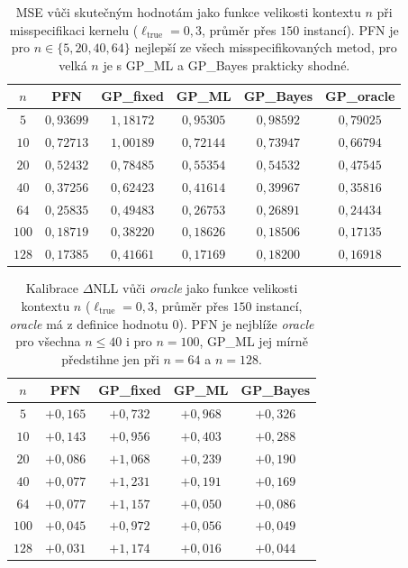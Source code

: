 \begin{table}[!htb]
    \centering
    \begin{tabular}{cccccc}
    \hline
    $n$ & PFN & GP\_fixed & GP\_ML & GP\_Bayes & GP\_oracle \\
    \hline
    $5$   & $0{,}93699$ & $1{,}18172$ & $0{,}95305$ & $0{,}98592$ & $0{,}79025$ \\
    $10$  & $0{,}72713$ & $1{,}00189$ & $0{,}72144$ & $0{,}73947$ & $0{,}66794$ \\
    $20$  & $0{,}52432$ & $0{,}78485$ & $0{,}55354$ & $0{,}54532$ & $0{,}47545$ \\
    $40$  & $0{,}37256$ & $0{,}62423$ & $0{,}41614$ & $0{,}39967$ & $0{,}35816$ \\
    $64$  & $0{,}25835$ & $0{,}49483$ & $0{,}26753$ & $0{,}26891$ & $0{,}24434$ \\
    $100$ & $0{,}18719$ & $0{,}38220$ & $0{,}18626$ & $0{,}18506$ & $0{,}17135$ \\
    $128$ & $0{,}17385$ & $0{,}41661$ & $0{,}17169$ & $0{,}18200$ & $0{,}16918$ \\
    \hline
    \end{tabular}
    \caption{MSE vůči skutečným hodnotám jako funkce velikosti kontextu $n$ při misspecifikaci kernelu ($\ell_{\text{true}} = 0{,}3$, průměr přes $150$ instancí). PFN je pro $n \in \{5, 20, 40, 64\}$ nejlepší ze všech misspecifikovaných metod, pro velká $n$ je s GP\_ML a GP\_Bayes prakticky shodné.}
    \label{tab:exp7_mse_n}
\end{table}

\begin{table}[!htb]
    \centering
    \begin{tabular}{ccccc}
    \hline
    $n$ & PFN & GP\_fixed & GP\_ML & GP\_Bayes \\
    \hline
    $5$   & $+0{,}165$ & $+0{,}732$ & $+0{,}968$ & $+0{,}326$ \\
    $10$  & $+0{,}143$ & $+0{,}956$ & $+0{,}403$ & $+0{,}288$ \\
    $20$  & $+0{,}086$ & $+1{,}068$ & $+0{,}239$ & $+0{,}190$ \\
    $40$  & $+0{,}077$ & $+1{,}231$ & $+0{,}191$ & $+0{,}169$ \\
    $64$  & $+0{,}077$ & $+1{,}157$ & $+0{,}050$ & $+0{,}086$ \\
    $100$ & $+0{,}045$ & $+0{,}972$ & $+0{,}056$ & $+0{,}049$ \\
    $128$ & $+0{,}031$ & $+1{,}174$ & $+0{,}016$ & $+0{,}044$ \\
    \hline
    \end{tabular}
    \caption{Kalibrace $\Delta$NLL vůči \emph{oracle} jako funkce velikosti kontextu $n$ ($\ell_{\text{true}} = 0{,}3$, průměr přes $150$ instancí, \emph{oracle} má z definice hodnotu $0$). PFN je nejblíže \emph{oracle} pro všechna $n \leq 40$ i pro $n = 100$, GP\_ML jej mírně předstihne jen při $n = 64$ a $n = 128$.}
    \label{tab:exp7_dnll_n}
\end{table}

